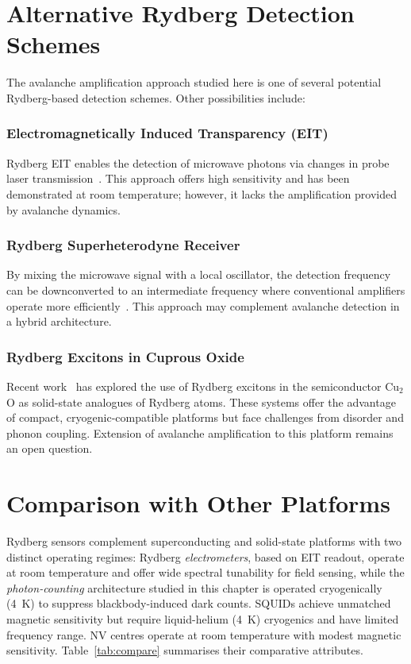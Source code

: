 \section{Alternative Rydberg Detection Schemes}

The avalanche amplification approach studied here is one of several potential Rydberg-based detection schemes. Other possibilities include:

\subsubsection{Electromagnetically Induced Transparency (EIT)}

Rydberg EIT enables the detection of microwave photons via changes in probe laser transmission~\cite {Holloway2014}. This approach offers high sensitivity and has been demonstrated at room temperature; however, it lacks the amplification provided by avalanche dynamics.

\subsubsection{Rydberg Superheterodyne Receiver}

By mixing the microwave signal with a local oscillator, the detection frequency can be downconverted to an intermediate frequency where conventional amplifiers operate more efficiently~\cite{Jing2020}. This approach may complement avalanche detection in a hybrid architecture.

\subsubsection{Rydberg Excitons in Cuprous Oxide}

Recent work~\cite{Gallagher2022,Walther2024} has explored the use of Rydberg excitons in the semiconductor Cu$_2$O as solid-state analogues of Rydberg atoms. These systems offer the advantage of compact, cryogenic-compatible platforms but face challenges from disorder and phonon coupling. Extension of avalanche amplification to this platform remains an open question.

\section{Comparison with Other Platforms}
Rydberg sensors complement superconducting and solid-state platforms with two distinct operating regimes: Rydberg \emph{electrometers}, based on EIT readout, operate at room temperature and offer wide spectral tunability for field sensing, while the \emph{photon-counting} architecture studied in this chapter is operated cryogenically (4~K) to suppress blackbody-induced dark counts. SQUIDs achieve unmatched magnetic sensitivity but require liquid-helium (4~K) cryogenics and have limited frequency range. NV centres operate at room temperature with modest magnetic sensitivity. Table~\ref{tab:compare} summarises their comparative attributes.

